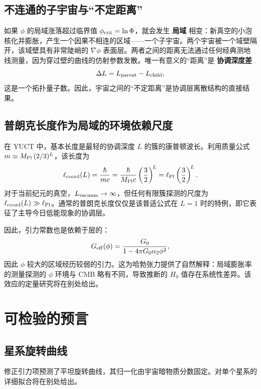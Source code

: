 \documentclass[12pt,a4paper]{article}
\begin{document}
	\subsection{不连通的子宇宙与“不定距离”}
	如果 \(\phi\) 的局域涨落超过临界值 \(\phi_{\rm crit}=\ln\Phi\)，就会发生 \textbf{局域} 相变：新真空的小泡核化并膨胀，产生一个因果不相连的区域——一个子宇宙。两个宇宙被一个域壁隔开，该域壁具有非常陡峭的 \(\nabla\phi\) 表面层。两者之间的距离无法通过任何经典测地线测量，因为穿过壁的曲线的仿射参数发散。唯一有意义的“距离”是 \textbf{协调深度差}
	\begin{equation}
		\Delta L = L_{\rm parent} - L_{\rm child},
		\label{eq:deltaL}
	\end{equation}
	这是一个拓扑量子数。因此，宇宙之间的“不定距离”是协调层离散结构的直接结果。
	
	\subsection{普朗克长度作为局域的环境依赖尺度}
	在 YUCT 中，基本长度是最轻的协调深度 \(L\) 的簇的康普顿波长。利用质量公式 \(m \simeq M_{\rm Pl}\,(2/3)^L\)，该长度为
	\begin{equation}
		\ell_{\rm coord}(L) = \frac{\hbar}{m c}
		= \frac{\hbar}{M_{\rm Pl}c} \left(\frac{3}{2}\right)^{\!L}
		= \ell_{\rm Pl} \left(\frac{3}{2}\right)^{\!L}.
		\label{eq:length-from-L}
	\end{equation}
	对于当前纪元的真空，\(L_{\rm vacuum}\to\infty\)，但任何有限簇探测的尺度为 \(\ell_{\rm coord}(L) \gg \ell_{\rm Pl}\)。通常的普朗克长度仅仅是该普适公式在 \(L=1\) 时的特例，即它表征了主导今日低能现象的协调层。
	
	因此，引力常数也是依赖于层的：
	\begin{equation}
		G_{\rm eff}(\phi) = \frac{G_0}{1-4\pi G_0\alpha_2\phi^2},
		\label{eq:Geff-layer}
	\end{equation}
	因此 \(\phi\) 较大的区域经历较弱的引力。这为哈勃张力提供了自然解释：局域膨胀率的测量探测的 \(\phi\) 环境与 CMB 略有不同，导致推断的 \(H_0\) 值存在系统性差异。该效应的定量研究将在别处给出。
	
	\section{可检验的预言}
	
	\subsection{星系旋转曲线}
	修正引力项预测了平坦旋转曲线，其归一化由宇宙暗物质分数固定。对单个星系的详细拟合将在别处给出。
	
\end{document}
